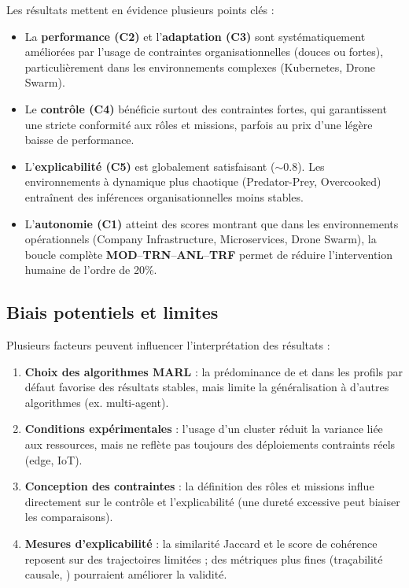 Les résultats mettent en évidence plusieurs points clés :
\begin{itemize}
  \item La \textbf{performance (C2)} et l'\textbf{adaptation (C3)} sont systématiquement améliorées par l'usage de contraintes organisationnelles (douces ou fortes), particulièrement dans les environnements complexes (Kubernetes, Drone Swarm).
  \item Le \textbf{contrôle (C4)} bénéficie surtout des contraintes fortes, qui garantissent une stricte conformité aux rôles et missions, parfois au prix d'une légère baisse de performance.
  \item L'\textbf{explicabilité (C5)} est globalement satisfaisant ($\sim 0.8$). Les environnements à dynamique plus chaotique (Predator-Prey, Overcooked) entraînent des inférences organisationnelles moins stables.
  \item L'\textbf{autonomie (C1)} atteint des scores montrant que dans les environnements opérationnels (Company Infrastructure, Microservices, Drone Swarm), la boucle complète \textbf{MOD}–\textbf{TRN}–\textbf{ANL}–\textbf{TRF} permet de réduire l'intervention humaine de l'ordre de 20\%.
\end{itemize}

\subsection{Biais potentiels et limites}

Plusieurs facteurs peuvent influencer l'interprétation des résultats :
\begin{enumerate}[label={\alph*)}]
  \item \textbf{Choix des algorithmes MARL} : la prédominance de  et  dans les profils par défaut favorise des résultats stables, mais limite la généralisation à d'autres algorithmes (ex.  multi-agent).
  \item \textbf{Conditions expérimentales} : l'usage d'un cluster  réduit la variance liée aux ressources, mais ne reflète pas toujours des déploiements contraints réels (edge, IoT).
  \item \textbf{Conception des contraintes} : la définition des rôles et missions influe directement sur le contrôle et l'explicabilité (une dureté excessive peut biaiser les comparaisons).
  \item \textbf{Mesures d'explicabilité} : la similarité Jaccard et le score de cohérence reposent sur des trajectoires limitées ; des métriques plus fines (traçabilité causale, ) pourraient améliorer la validité.
\end{enumerate}

